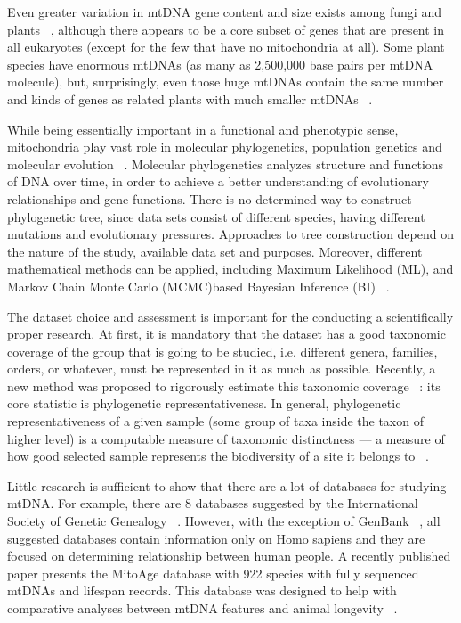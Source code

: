 \documentclass[a4paper,11pt]{article}
\begin{document}
Even greater variation in mtDNA gene content and size exists among fungi and plants ~\cite{taylor2005mitochondrial},
although there appears to be a core subset of genes that are present in all eukaryotes (except
for the few that have no mitochondria at all). Some plant species have enormous mtDNAs (as
many as 2,500,000 base pairs per mtDNA molecule), but, surprisingly, even those huge
mtDNAs contain the same number and kinds of genes as related plants with much smaller
mtDNAs ~\cite{youtheoryofself}.

While being essentially important in a functional and phenotypic sense, mitochondria play
vast role in molecular phylogenetics, population genetics and molecular evolution ~\cite{ward1981mitochondrial}.
Molecular phylogenetics analyzes structure and functions of DNA over time, in order to achieve
a better understanding of evolutionary relationships and gene functions. There is no determined
way to construct phylogenetic tree, since data sets consist of different species, having different
mutations and evolutionary pressures. Approaches to tree construction depend on the nature of
the study, available data set and purposes. Moreover, different mathematical methods can be
applied, including Maximum Likelihood (ML), and Markov Chain Monte Carlo (MCMC)­based
Bayesian Inference (BI) ~\cite{gissi2008evolution}.

The dataset choice and assessment is important for the conducting a scientifically proper
research. At first, it is mandatory that the dataset has a good taxonomic coverage of the group
that is going to be studied, i.e. different genera, families, orders, or whatever, must be
represented in it as much as possible. Recently, a new method was proposed to rigorously
estimate this taxonomic coverage ~\cite{dowell2005molecular}: its core statistic is phylogenetic representativeness. In
general, phylogenetic representativeness of a given sample (some group of taxa inside the
taxon of higher level) is a computable measure of taxonomic distinctness — a measure of how
good selected sample represents the biodiversity of a site it belongs to ~\cite{dowell2005molecular}.

Little research is sufficient to show that there are a lot of databases for studying mtDNA. For
example, there are 8 databases suggested by the International Society of Genetic Genealogy
~\cite{dnadatabases}. However, with the exception of GenBank ~\cite{ncbimain}, all suggested databases contain information
only on Homo sapiens and they are focused on determining relationship between human
people. A recently published paper presents the MitoAge database with 922 species with fully
sequenced mtDNAs and lifespan records. This database was designed to help with comparative
analyses between mtDNA features and animal longevity ~\cite{toren2015mitoage}.
\end{document}
